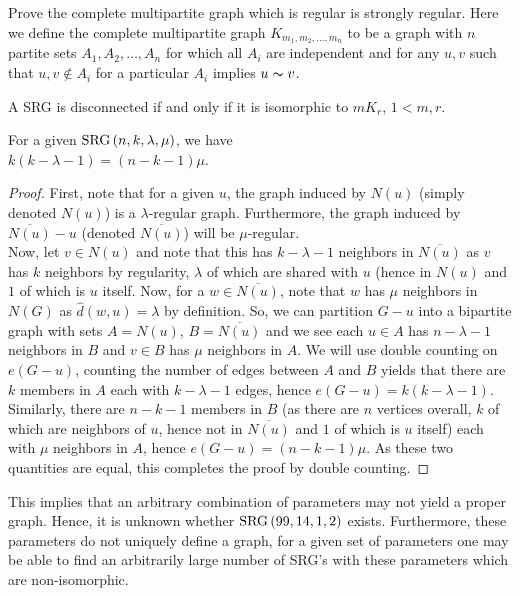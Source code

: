 \begin{problem}
	Prove the complete multipartite graph which is regular is strongly regular. Here we define the complete multipartite graph $K_{m_1, m_2, \ldots, m_{n}}$ to be a graph with $n$ partite sets $A_1, A_2, \ldots, A_{n}$ for which all $A_{i}$ are independent and for any $u, v$ such that $u, v \not\in A_{i}$ for a particular $A_{i}$ implies $u \thicksim v$.
\end{problem}
\begin{solution}

\end{solution}
\begin{proposition}
A SRG is disconnected if and only if it is isomorphic to $mK_{r}$, $1 < m, r$.
\end{proposition}
\newpage
\begin{proposition}
	For a given $\operatorname{SRG}\left( n, k, \lambda, \mu \right) $, we have \\$k\left( k - \lambda - 1 \right) = \left( n - k - 1 \right) \mu$.
\end{proposition}
\begin{proof}
	First, note that for a given $u$, the graph induced by $N\left( u \right) $ (simply denoted $N\left( u \right)$) is a $\lambda$-regular graph. Furthermore, the graph induced by $\overline{N\left( u \right) } - u$ (denoted $\overline{N \left( u \right) }$)  will be $\mu$-regular.\\
	Now, let $v \in N\left( u \right) $ and note that this has $k - \lambda - 1$ neighbors in $\overline{N \left( u \right)}$ as $v$ has $k$ neighbors by regularity, $\lambda$ of which are shared with $u$ (hence in $N\left( u \right) $ and $1$ of which is $u$ itself. Now, for a $w \in \overline{N \left( u \right)}$, note that $w$ has $\mu$ neighbors in $N\left( G \right) $ as $\hat{d} \left( w, u \right) = \lambda$ by definition. So, we can partition $G - u$ into a  bipartite graph with sets $A = N\left( u \right) $, $B = \overline{N \left( u \right)} $ and we see each $u \in A$ has $n - \lambda - 1$ neighbors in $B$ and $v \in B$ has $\mu$ neighbors in $A$. We will use double counting on $e\left( G - u \right) $, counting the number of edges between  $A$ and $B$ yields that there are $k$ members in $A$ each with $k - \lambda - 1$ edges, hence $e\left( G - u \right)  = k \left( k - \lambda - 1 \right) $. Similarly, there are $n - k -1$ members in $B$ (as there are  $n$ vertices overall, $k$ of which are neighbors of $u$, hence not in $\overline{N \left( u \right)} $ and $1$ of which is $u$ itself) each with $\mu$ neighbors in $A$, hence $e\left( G - u \right) = (n - k - 1)\mu$. As these two quantities are equal, this completes the proof by double counting.
\end{proof}
\begin{remark}
	This implies that an arbitrary combination of parameters may not yield a proper graph. Hence, it is unknown whether $\operatorname{SRG}\left( 99, 14, 1, 2 \right) $ exists. Furthermore, these parameters do not uniquely define a graph, for a given set of parameters one may be able to find an arbitrarily large number of SRG's with these parameters which are non-isomorphic.
\end{remark}
